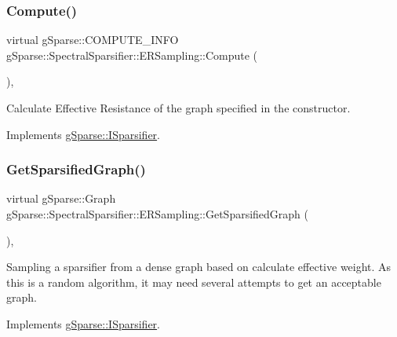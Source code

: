 \subsubsection{\texorpdfstring{Compute()}{Compute()}}
{\footnotesize\ttfamily virtual g\+Sparse\+::\+C\+O\+M\+P\+U\+T\+E\+\_\+\+I\+N\+FO g\+Sparse\+::\+Spectral\+Sparsifier\+::\+E\+R\+Sampling\+::\+Compute (\begin{DoxyParamCaption}{ }\end{DoxyParamCaption})\hspace{0.3cm}{\ttfamily [inline]}, {\ttfamily [virtual]}}

Calculate Effective Resistance of the graph specified in the constructor. 

Implements \mbox{\hyperlink{classg_sparse_1_1_i_sparsifier_a06f2be6951ef90ec695cadf57ce2cb3e}{g\+Sparse\+::\+I\+Sparsifier}}.

\mbox{\label{classg_sparse_1_1_spectral_sparsifier_1_1_e_r_sampling_a5322f1076777028699d010daa5cd2406}} 
\subsubsection{\texorpdfstring{Get\+Sparsified\+Graph()}{GetSparsifiedGraph()}}
{\footnotesize\ttfamily virtual g\+Sparse\+::\+Graph g\+Sparse\+::\+Spectral\+Sparsifier\+::\+E\+R\+Sampling\+::\+Get\+Sparsified\+Graph (\begin{DoxyParamCaption}{ }\end{DoxyParamCaption})\hspace{0.3cm}{\ttfamily [inline]}, {\ttfamily [virtual]}}

Sampling a sparsifier from a dense graph based on calculate effective weight. As this is a random algorithm, it may need several attempts to get an acceptable graph. 

Implements \mbox{\hyperlink{classg_sparse_1_1_i_sparsifier_a2e1abc3830d561366a0c0e1477510c63}{g\+Sparse\+::\+I\+Sparsifier}}.

\mbox{\label{classg_sparse_1_1_spectral_sparsifier_1_1_e_r_sampling_a35bf03bbda2e0d37345ce8d460e734a4}} 

